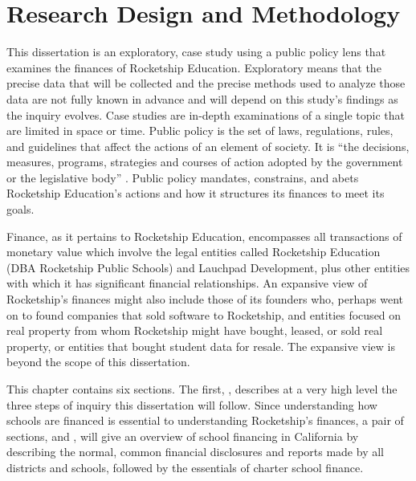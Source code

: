 
\chapter{Research Design and Methodology}\label{ch:methods}\indent%

This dissertation is an exploratory, case study using a public policy lens that examines the finances of Rocketship Education. Exploratory means that the precise data that will be collected and the precise methods used to analyze those data are not fully known in advance and will depend on this study's findings as the inquiry evolves. Case studies are in-depth examinations of a single topic that are limited in space or time. Public policy is the set of laws, regulations, rules, and guidelines that affect the actions of an element of society. It is ``the decisions, measures, programs, strategies and courses of action adopted by the government or the legislative body'' \parencite[3]{Knill.Tosun2020}. Public policy mandates, constrains, and abets Rocketship Education's actions and how it structures its finances to meet its goals.

Finance, as it pertains to Rocketship Education, encompasses all transactions of monetary value which involve the legal entities called Rocketship Education (DBA Rocketship Public Schools) and Lauchpad Development, plus other entities with which it has significant financial relationships. An expansive view of Rocketship's finances might also include those of its founders who, perhaps went on to found companies that sold software to Rocketship, and entities focused on real property from whom Rocketship might have bought, leased, or sold real property, or entities that bought student data for resale. The expansive view is beyond the scope of this dissertation.

This chapter contains six sections. The first, ,
describes at a very high level the three steps of inquiry this dissertation will follow. Since understanding how schools are financed is essential to understanding Rocketship's finances, a pair of sections,  and , will give an overview of school financing in California by describing the normal, common financial disclosures and reports made by all districts and schools, followed by the essentials of charter school finance. 


